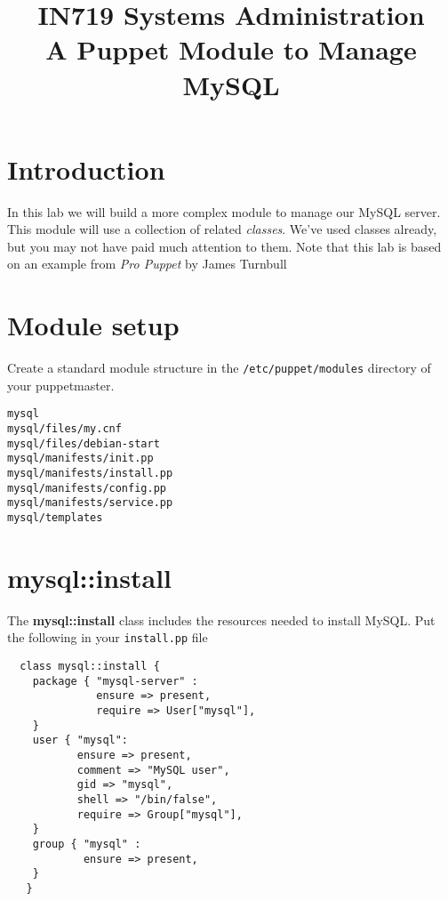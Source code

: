 \documentclass{article}   	%
\title{IN719 Systems Administration\\A Puppet Module to Manage MySQL}
\date{}							%
\begin{document}
\maketitle

\section*{Introduction}
In this lab we will build a more complex module to manage our MySQL server.  This module will use a collection of related \emph{classes}.  We've used classes already, but you may not have paid much attention to them.  Note that this lab is based on an example from \emph{Pro Puppet} by James Turnbull

\section{Module setup}
Create a standard module structure in the \texttt{/etc/puppet/modules} directory of your puppetmaster.

\texttt{mysql} \\
\texttt{mysql/files/my.cnf} \\
\texttt{mysql/files/debian-start} \\
\texttt{mysql/manifests/init.pp} \\
\texttt{mysql/manifests/install.pp} \\
\texttt{mysql/manifests/config.pp} \\
\texttt{mysql/manifests/service.pp} \\
\texttt{mysql/templates} \\



\section{mysql::install}
The \textbf{mysql::install} class includes the resources needed to install MySQL.  Put the following in your \texttt{install.pp} file

\begin{verbatim}
  class mysql::install {
    package { "mysql-server" :
              ensure => present,
              require => User["mysql"],
    }
    user { "mysql":
           ensure => present,
           comment => "MySQL user",
           gid => "mysql",
           shell => "/bin/false",
           require => Group["mysql"],
    }
    group { "mysql" :
            ensure => present,
    }
   }

\end{verbatim}
\end{document}
